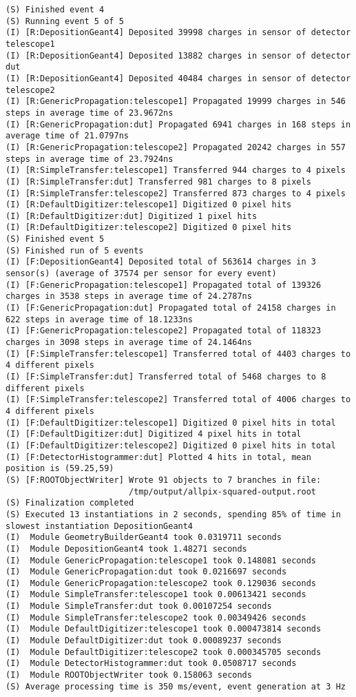 \begin{lstlisting}[breaklines]
(S) Finished event 4
(S) Running event 5 of 5
(I) [R:DepositionGeant4] Deposited 39998 charges in sensor of detector telescope1
(I) [R:DepositionGeant4] Deposited 13882 charges in sensor of detector dut
(I) [R:DepositionGeant4] Deposited 40484 charges in sensor of detector telescope2
(I) [R:GenericPropagation:telescope1] Propagated 19999 charges in 546 steps in average time of 23.9672ns
(I) [R:GenericPropagation:dut] Propagated 6941 charges in 168 steps in average time of 21.0797ns
(I) [R:GenericPropagation:telescope2] Propagated 20242 charges in 557 steps in average time of 23.7924ns
(I) [R:SimpleTransfer:telescope1] Transferred 944 charges to 4 pixels
(I) [R:SimpleTransfer:dut] Transferred 981 charges to 8 pixels
(I) [R:SimpleTransfer:telescope2] Transferred 873 charges to 4 pixels
(I) [R:DefaultDigitizer:telescope1] Digitized 0 pixel hits
(I) [R:DefaultDigitizer:dut] Digitized 1 pixel hits
(I) [R:DefaultDigitizer:telescope2] Digitized 0 pixel hits
(S) Finished event 5
(S) Finished run of 5 events
(I) [F:DepositionGeant4] Deposited total of 563614 charges in 3 sensor(s) (average of 37574 per sensor for every event)
(I) [F:GenericPropagation:telescope1] Propagated total of 139326 charges in 3538 steps in average time of 24.2787ns
(I) [F:GenericPropagation:dut] Propagated total of 24158 charges in 622 steps in average time of 18.1233ns
(I) [F:GenericPropagation:telescope2] Propagated total of 118323 charges in 3098 steps in average time of 24.1464ns
(I) [F:SimpleTransfer:telescope1] Transferred total of 4403 charges to 4 different pixels
(I) [F:SimpleTransfer:dut] Transferred total of 5468 charges to 8 different pixels
(I) [F:SimpleTransfer:telescope2] Transferred total of 4006 charges to 4 different pixels
(I) [F:DefaultDigitizer:telescope1] Digitized 0 pixel hits in total
(I) [F:DefaultDigitizer:dut] Digitized 4 pixel hits in total
(I) [F:DefaultDigitizer:telescope2] Digitized 0 pixel hits in total
(I) [F:DetectorHistogrammer:dut] Plotted 4 hits in total, mean position is (59.25,59)
(S) [F:ROOTObjectWriter] Wrote 91 objects to 7 branches in file:
                         /tmp/output/allpix-squared-output.root
(S) Finalization completed
(S) Executed 13 instantiations in 2 seconds, spending 85% of time in slowest instantiation DepositionGeant4
(I)  Module GeometryBuilderGeant4 took 0.0319711 seconds
(I)  Module DepositionGeant4 took 1.48271 seconds
(I)  Module GenericPropagation:telescope1 took 0.148081 seconds
(I)  Module GenericPropagation:dut took 0.0216697 seconds
(I)  Module GenericPropagation:telescope2 took 0.129036 seconds
(I)  Module SimpleTransfer:telescope1 took 0.00613421 seconds
(I)  Module SimpleTransfer:dut took 0.00107254 seconds
(I)  Module SimpleTransfer:telescope2 took 0.00349426 seconds
(I)  Module DefaultDigitizer:telescope1 took 0.000473814 seconds
(I)  Module DefaultDigitizer:dut took 0.00089237 seconds
(I)  Module DefaultDigitizer:telescope2 took 0.000345705 seconds
(I)  Module DetectorHistogrammer:dut took 0.0508717 seconds
(I)  Module ROOTObjectWriter took 0.158063 seconds
(S) Average processing time is 350 ms/event, event generation at 3 Hz
\end{lstlisting}
